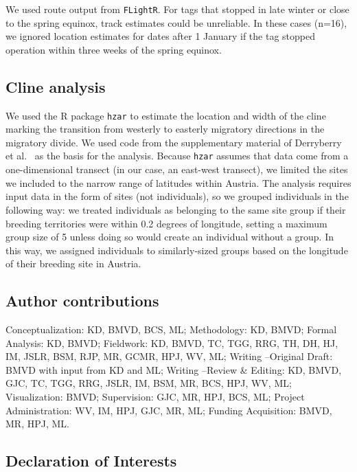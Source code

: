 \documentclass[a4paper, nobind]{templates/ociamthesis}
\begin{document}
We used route output from \texttt{FLightR}. For tags that stopped in late winter or close to the spring equinox, track estimates could be unreliable. In these cases (n=16), we ignored location estimates for dates after 1 January if the tag stopped operation within three weeks of the spring equinox.

\hypertarget{cline-analysis}{%
\subsection{Cline analysis}\label{cline-analysis}}

We used the R package \texttt{hzar} \autocite{derryberryHzarHybridZone2014} to estimate the location and width of the cline marking the transition from westerly to easterly migratory directions in the migratory divide. We used code from the supplementary material of Derryberry et al.~\autocite*{derryberryHzarHybridZone2014} as the basis for the analysis. Because \texttt{hzar} assumes that data come from a one-dimensional transect (in our case, an east-west transect), we limited the sites we included to the narrow range of latitudes within Austria. The analysis requires input data in the form of sites (not individuals), so we grouped individuals in the following way: we treated individuals as belonging to the same site group if their breeding territories were within 0.2 degrees of longitude, setting a maximum group size of 5 unless doing so would create an individual without a group. In this way, we assigned individuals to similarly-sized groups based on the longitude of their breeding site in Austria.

\hypertarget{author-contributions}{%
\subsection{Author contributions}\label{author-contributions}}

Conceptualization: KD, BMVD, BCS, ML; Methodology: KD, BMVD; Formal Analysis: KD, BMVD; Fieldwork: KD, BMVD, TC, TGG, RRG, TH, DH, HJ, IM, JSLR, BSM, RJP, MR, GCMR, HPJ, WV, ML; Writing --Original Draft: BMVD with input from KD and ML; Writing --Review \& Editing: KD, BMVD, GJC, TC, TGG, RRG, JSLR, IM, BSM, MR, BCS, HPJ, WV, ML; Visualization: BMVD; Supervision: GJC, MR, HPJ, BCS, ML; Project Administration: WV, IM, HPJ, GJC, MR, ML; Funding Acquisition: BMVD, MR, HPJ, ML.

\hypertarget{declaration-of-interests}{%
\subsection{Declaration of Interests}\label{declaration-of-interests}}
\end{document}
